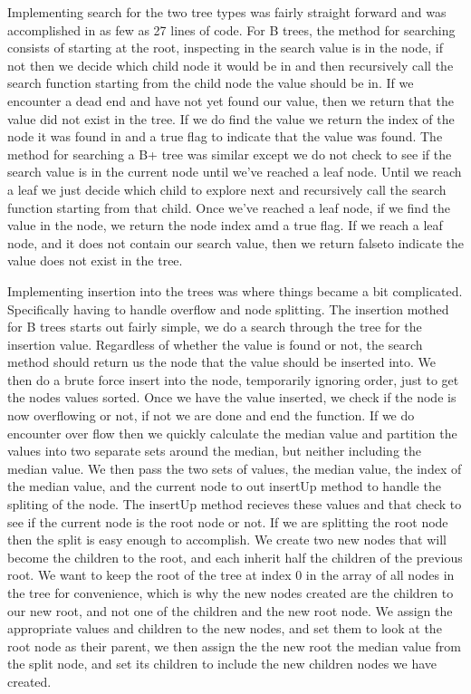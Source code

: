     Implementing search for the two tree types was fairly straight forward and was accomplished in as few as 27 lines of code.  
For B trees, the method for searching consists of starting at the root, inspecting in the search value is in the node, if not 
then we decide which child node it would be in and then recursively call the search function starting from the child node the value 
should be in.  If we encounter a dead end and have not yet found our value, then we return that the value did not exist in the tree.
If we do find the value we return the index of the node it was found in and a true flag to indicate that the value was found.  The 
method for searching a B+ tree was similar except we do not check to see if the search value is in the current node until we've 
reached a leaf node.  Until we reach a leaf we just decide which child to explore next and recursively call the search function 
starting from that child.  Once we've reached a leaf node, if we find the value in the node, we return the node index amd a true flag.  If we reach a leaf node, and it does not contain our search value, then we return falseto indicate the value does not exist
 in the tree.
 
    Implementing insertion into the trees was where things became a bit complicated.  Specifically having to handle overflow and node splitting.  The insertion mothed for B trees starts out fairly simple, we do a search through the tree for the insertion value.  Regardless of whether the value is found or not, the search method should return us the node that the value should be inserted into.  We then do a brute force insert into the node, temporarily ignoring order, just to get the nodes values sorted.  Once we have the value inserted, we check if the node is now overflowing or not, if not we are done and end the function.  If we do encounter over flow then we quickly calculate the median value and partition the values into two separate sets around the median, but neither including the median value.  We then pass the two sets of values, the median value, the index of the median value, and the current node to out insertUp method to handle the spliting of the node.  The insertUp method recieves these values and that check to see if the current node is the root node or not.  If we are splitting the root node then the split is easy enough to accomplish.  We create two new nodes that will become the children to the root, and each inherit half the children of the previous root.  We want to keep the root of the tree at index 0 in the array of all nodes in the tree for convenience, which is why the new nodes created are the children to our new root, and not one of the children and the new root node.  We assign the appropriate values and children to the new nodes, and set them to look at the root node as their parent, we then assign the the new root the median value from the split node, and set its children to include the new children nodes we have created.
    
